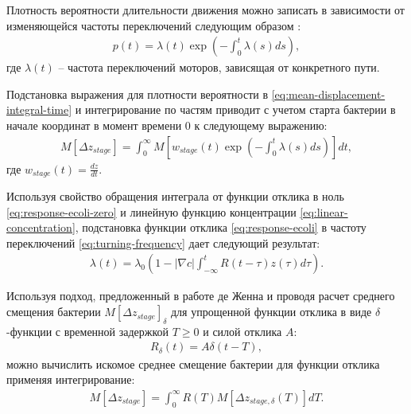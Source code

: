 Плотность вероятности длительности движения можно записать в зависимости от изменяющейся частоты переключений следующим образом \cite{pasupathy_generating_2011}:
\begin{equation}
    \begin{aligned}
        p(t)=\lambda(t) \exp \left ( -\int_0^t \lambda(s) ds \right ),
    \label{eq:duration-prob-exp-integral}
    \end{aligned}
\end{equation}
где $\lambda(t)$ -- частота переключений моторов, зависящая от конкретного пути.

Подстановка выражения для плотности вероятности в \cref{eq:mean-displacement-integral-time} и интегрирование по частям приводит с учетом старта бактерии в начале координат в момент времени 0 к следующему выражению:
\begin{equation}
    \begin{aligned}
        M[\Delta z_{stage}]=\int_0^{\infty} M \left [w_{stage}(t) \exp \left ( -\int_0^t \lambda(s) ds \right ) \right ]dt,
    \label{eq:mean-displacement-on-frequency}
    \end{aligned}
\end{equation}
где $w_{stage}(t)=\frac{dz}{dt}$.

Используя свойство обращения интеграла от функции отклика в ноль \cref{eq:response-ecoli-zero} и линейную функцию концентрации \cref{eq:linear-concentration}, подстановка функции отклика \cref{eq:response-ecoli} в частоту переключений \cref{eq:turning-frequency} дает следующий результат:
\begin{equation}
    \begin{aligned}
        \lambda(t)=\lambda_0 \left ( 1 - |\nabla c| \int_{-\infty}^t R(t-\tau)z(\tau)d\tau \right ).
    \label{eq:frequency-on-response}
    \end{aligned}
\end{equation}

Используя подход, предложенный в работе де Женна \cite{de_gennes_chemotaxis_2004} и проводя расчет среднего смещения бактерии  $M[\Delta z_{stage}]_{\delta}$ для упрощенной функции отклика в виде $\delta$-функции с временной задержкой $T \geq 0$ и силой отклика $A$:
\begin{equation}
    \begin{aligned}
        R_\delta(t) = A \delta(t - T),
    \label{eq:response-delta}
    \end{aligned}
\end{equation}
можно вычислить искомое среднее смещение бактерии для функции отклика применяя интегрирование:
\begin{equation}
    \begin{aligned}
        M[\Delta z_{stage}]=\int_0^{\infty} R(T) M[\Delta z_{stage,\delta}(T)] dT.
    \label{eq:mean-displacement-on-md-delta}
    \end{aligned}
\end{equation}

